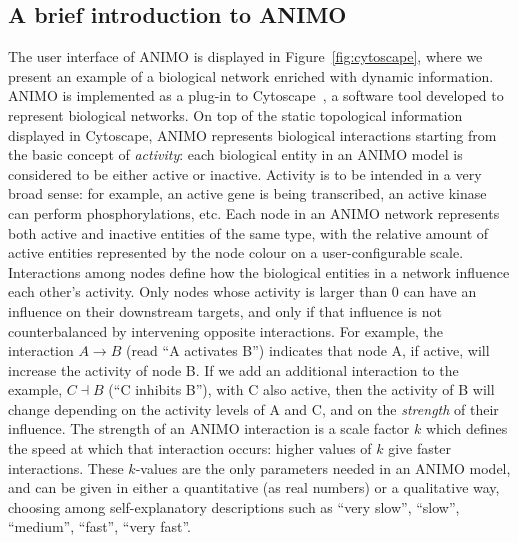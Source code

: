 \documentclass{bmcart}
\begin{document}
\subsection*{A brief introduction to ANIMO}
The user interface of ANIMO is displayed in Figure~\ref{fig:cytoscape},
where we present an example of a biological network enriched with dynamic information.
ANIMO is implemented as a plug-in to Cytoscape~\cite{cytoscape}, a software tool developed to represent biological networks.
On top of the static topological information displayed in Cytoscape, ANIMO represents
biological interactions starting from the basic concept of \emph{activity}:
each biological entity in an ANIMO model is considered to be either active or inactive.
Activity is to be intended in a very broad sense: for example, an active gene is being transcribed,
an active kinase can perform phosphorylations, etc. Each node in an ANIMO network represents
both active and inactive entities of the same type, with the relative amount of active entities
represented by the node colour on a user-configurable scale. Interactions among nodes define
how the biological entities in a network influence each other's activity.
Only nodes whose activity is larger than 0 can have an 
influence on their downstream targets, and only if that influence is not counterbalanced by intervening opposite interactions.
For example, the interaction $A\rightarrow B$ (read ``A activates B'') indicates that node A, if active,
will increase the activity of node B. If we add an additional interaction to the example,
$C \dashv$\hspace{0.1em}$B$ (``C inhibits B''), with C also active, then the activity of B will change depending on the
activity levels of A and C, and on the \emph{strength} of their influence.
The strength of an ANIMO interaction is a scale factor $k$ which defines the speed at which
that interaction occurs: higher values of $k$ give faster interactions. These $k$-values are
the only parameters needed in an ANIMO model, and can be given in either
a quantitative (as real numbers) or a qualitative way, choosing among self-explanatory descriptions
such as ``very slow'', ``slow'', ``medium'', ``fast'', ``very fast''.
\end{document}
